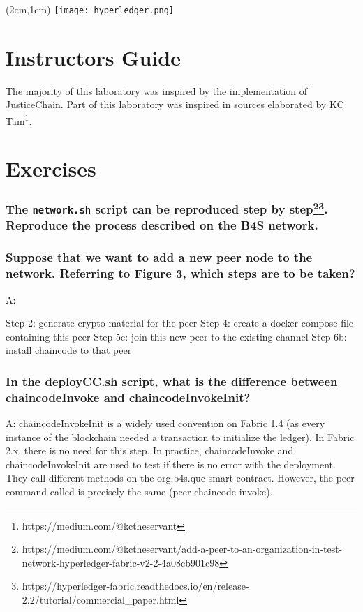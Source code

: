 \documentclass[12pt,a4paper]{article}
\begin{document}
\textblockorigin{-34pt}{-12pt}
\begin{textblock*}{10cm}(2cm,1cm)
\texttt{[image: hyperledger.png]}
\end{textblock*}

\section*{Instructors Guide}
The majority of this laboratory was inspired by the implementation of JusticeChain\cite{belchior2019_audits}. Part of this laboratory was inspired in sources elaborated by KC Tam\footnote{https://medium.com/@kctheservant}.

\section{Exercises}


\subsubsection*{The \texttt{network.sh} script can be reproduced step by step\footnote{https://medium.com/@kctheservant/add-a-peer-to-an-organization-in-test-network-hyperledger-fabric-v2-2-4a08cb901c98}\footnote{https://hyperledger-fabric.readthedocs.io/en/release-2.2/tutorial/commercial_paper.html}. Reproduce the process described on the B4S network.}

\subsubsection*{Suppose that we want to add a new peer node to the network. Referring to Figure 3, which steps are to be taken?}

A:

Step 2: generate crypto material for the peer
Step 4: create a docker-compose file containing this peer
Step 5c: join this new peer to the existing channel
Step 6b: install chaincode to that peer

\subsubsection*{In the deployCC.sh script, what is the difference between chaincodeInvoke and chaincodeInvokeInit?}

A: chaincodeInvokeInit is a widely used convention on Fabric 1.4 (as every instance of the blockchain needed a transaction to initialize the ledger). In Fabric 2.x, there is no need for this step. In practice, chaincodeInvoke and chaincodeInvokeInit are used to test if there is no error with the deployment. They call different methods on the org.b4s.quc smart contract. However, the peer command called is precisely the same (peer chaincode invoke).
\end{document}
